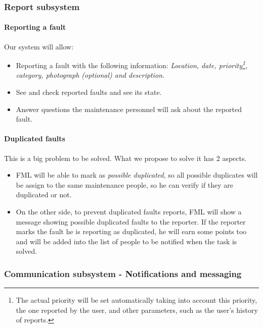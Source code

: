 \subsubsection{Report subsystem}

\paragraph{Reporting a fault} Our system will allow:

\begin{itemize}
\item Reporting a fault with the following information: \textit{Location, date, priority\footnote{The actual priority will be set automatically taking into account this priority, the one reported by the user, and other parameters, such as the user's history of reports.}, category, photograph (optional) and description}.

\item See and check reported faults and see its state.

\item Answer questions the maintenance personnel will ask about the reported fault.
\end{itemize}


\paragraph{Duplicated faults} This is a big problem to be solved. What we propose to solve it has 2 aspects.
\begin{itemize}
\item FML will be able to mark as \textit{possible duplicated}, so all possible duplicates will be assign to the same maintenance people, so he can verify if they are duplicated or not.

\item On the other side, to prevent duplicated faults reports, FML will show a message showing possible duplicated faults to the reporter. If the reporter marks the fault he is reporting as duplicated, he will earn some points too and will be added into the list of people to be notified when the task is solved.
\end{itemize}


\subsubsection{Communication subsystem - Notifications and messaging}

